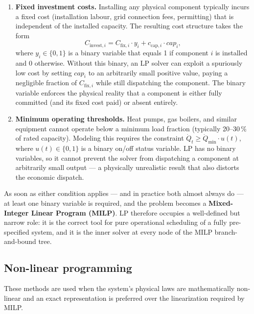 \documentclass[11pt,a4paper]{report}
\begin{document}
\begin{enumerate}
    \item \textbf{Fixed investment costs.}
    Installing any physical component typically incurs a fixed cost (installation labour, grid connection fees, permitting) that is independent of the installed capacity.
    The resulting cost structure takes the form
    \begin{equation}
        C_{\text{invest},i} = C_{\text{fix},i} \cdot y_i + c_{\text{cap},i} \cdot \mathit{cap}_i,
    \end{equation}
    where $y_i \in \{0,1\}$ is a binary variable that equals 1 if component $i$ is installed and 0 otherwise.
    Without this binary, an LP solver can exploit a spuriously low cost by setting $\mathit{cap}_i$ to an arbitrarily small positive value, paying a negligible fraction of $C_{\text{fix},i}$ while still dispatching the component.
    The binary variable enforces the physical reality that a component is either fully committed (and its fixed cost paid) or absent entirely.

    \item \textbf{Minimum operating thresholds.}
    Heat pumps, gas boilers, and similar equipment cannot operate below a minimum load fraction (typically 20--30\,\% of rated capacity).
    Modeling this requires the constraint $\dot{Q}_t \geq \dot{Q}_{\min} \cdot u(t)$, where $u(t) \in \{0,1\}$ is a binary on/off status variable.
    LP has no binary variables, so it cannot prevent the solver from dispatching a component at arbitrarily small output --- a physically unrealistic result that also distorts the economic dispatch.
\end{enumerate}

\noindent As soon as either condition applies --- and in practice both almost always do --- at least one binary variable is required, and the problem becomes a \textbf{Mixed-Integer Linear Program (MILP)}.
LP therefore occupies a well-defined but narrow role: it is the correct tool for pure operational scheduling of a fully pre-specified system, and it is the inner solver at every node of the MILP branch-and-bound tree.

\subsection{Non-linear programming}
These methods are used when the system's physical laws are mathematically non-linear and an exact representation is preferred over the linearization required by MILP.
\end{document}
